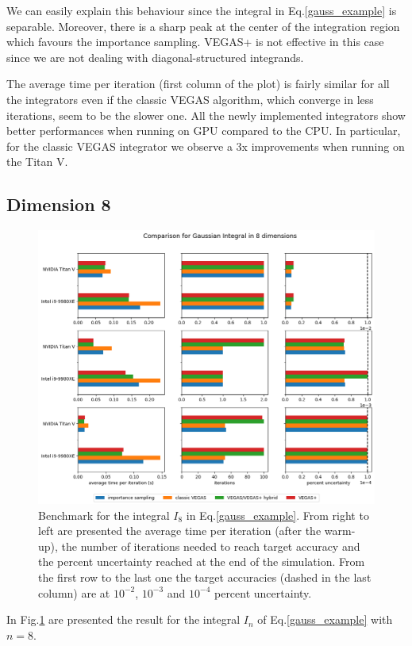 \documentclass[../main/main.tex]{subfiles}
\begin{document}
We can easily explain this behaviour since the integral in Eq.\eqref{gauss_example} is separable. Moreover, there is a sharp peak at the center of the integration region which favours the importance sampling. VEGAS+ is not effective in this case since we are not dealing with diagonal-structured integrands.

The average time per iteration (first column of the plot) is fairly similar for all the integrators even if the classic VEGAS algorithm, which converge in less iterations, seem to be the slower one. All the newly implemented integrators show better performances when running on GPU compared to the CPU. In particular, for the classic VEGAS integrator we observe a 3x improvements when running on the Titan V.
\subsection{Dimension 8}
\begin{figure}
	\centering
	\includegraphics[width=\textwidth]{../images/gauss8d_final.png}
	\caption{Benchmark  for the integral $I_8$ in Eq.\eqref{gauss_example}. From right to left are presented the average time per iteration (after the warm-up), the number of iterations needed to reach target accuracy and the percent uncertainty reached at the end of the simulation. From the first row to the last one the target accuracies (dashed in the last column) are at $10^{-2}$, $10^{-3}$ and $10^{-4}$ percent uncertainty.}
	\label{gauss8d}
\end{figure}
In Fig.\ref{gauss8d} are presented the result for the integral $I_n$ of Eq.\eqref{gauss_example} with $n = 8$.
\end{document}
